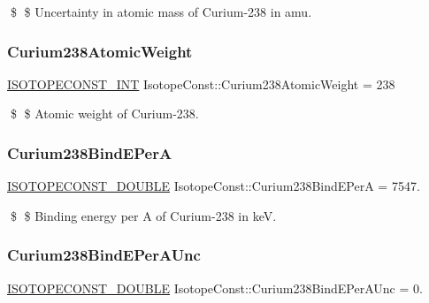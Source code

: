 \$ \$ Uncertainty in atomic mass of Curium-\/238 in amu. \mbox{\label{group___isotope_const-_curium-_cm238_ga7bc21a74aafd18081f735e4558dd442d}} 
\subsubsection{\texorpdfstring{Curium238\+Atomic\+Weight}{Curium238AtomicWeight}}
{\footnotesize\ttfamily \mbox{\hyperlink{group___isotope_const-_macros_ga5f18360b3e99483a35c32d789e62621c}{I\+S\+O\+T\+O\+P\+E\+C\+O\+N\+S\+T\+\_\+\+I\+NT}} Isotope\+Const\+::\+Curium238\+Atomic\+Weight = 238}

\$ \$ Atomic weight of Curium-\/238. \mbox{\label{group___isotope_const-_curium-_cm238_gab7530f9c2355220735dacc352495a810}} 
\subsubsection{\texorpdfstring{Curium238\+Bind\+E\+PerA}{Curium238BindEPerA}}
{\footnotesize\ttfamily \mbox{\hyperlink{group___isotope_const-_macros_ga8f45a7272ce02c0b4c65c44636ed719a}{I\+S\+O\+T\+O\+P\+E\+C\+O\+N\+S\+T\+\_\+\+D\+O\+U\+B\+LE}} Isotope\+Const\+::\+Curium238\+Bind\+E\+PerA = 7547.}

\$ \$ Binding energy per A of Curium-\/238 in keV. \mbox{\label{group___isotope_const-_curium-_cm238_gadf01f5672af69ce83f681e7179e5a332}} 
\subsubsection{\texorpdfstring{Curium238\+Bind\+E\+Per\+A\+Unc}{Curium238BindEPerAUnc}}
{\footnotesize\ttfamily \mbox{\hyperlink{group___isotope_const-_macros_ga8f45a7272ce02c0b4c65c44636ed719a}{I\+S\+O\+T\+O\+P\+E\+C\+O\+N\+S\+T\+\_\+\+D\+O\+U\+B\+LE}} Isotope\+Const\+::\+Curium238\+Bind\+E\+Per\+A\+Unc = 0.}

